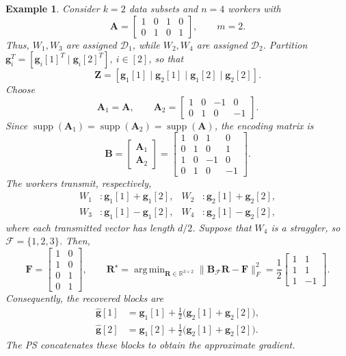 \documentclass[journal,draftcls,onecolumn]{IEEEtran}
\theoremstyle{mystyle}
\newtheorem{example}{Example}
\DeclareMathOperator*{\argmin}{arg\,min}
\begin{document}
\begin{example}
Consider $k=2$ data subsets and $n=4$ workers with
\[
\mathbf{A}=
\begin{bmatrix}
1&0&1&0\\
0&1&0&1
\end{bmatrix},
\qquad m=2.
\]
Thus, $W_1,W_3$ are assigned $\mathcal{D}_1$, while $W_2,W_4$ are
assigned $\mathcal{D}_2$. Partition
$\mathbf{g}_i^T=[\mathbf{g}_i[1]^T\mid\mathbf{g}_i[2]^T]$, $i\in[2]$,
so that
\[
\mathbf{Z}
=
[\mathbf{g}_1[1]\mid\mathbf{g}_2[1]\mid
 \mathbf{g}_1[2]\mid\mathbf{g}_2[2]].
\]
Choose
\[
\mathbf{A}_1=\mathbf{A},
\qquad
\mathbf{A}_2=
\begin{bmatrix}
1&0&-1&0\\
0&1&0&-1
\end{bmatrix}.
\]
Since $\operatorname{supp}(\mathbf{A}_1)
=\operatorname{supp}(\mathbf{A}_2)
=\operatorname{supp}(\mathbf{A})$, the encoding matrix is
\[
\mathbf{B}
=
\begin{bmatrix}
\mathbf{A}_1\\
\mathbf{A}_2
\end{bmatrix}
=
\begin{bmatrix}
1&0&1&0\\
0&1&0&1\\
1&0&-1&0\\
0&1&0&-1
\end{bmatrix}.
\]
The workers transmit, respectively,
\[
\begin{aligned}
W_1&:\mathbf{g}_1[1]+\mathbf{g}_1[2],&
W_2&:\mathbf{g}_2[1]+\mathbf{g}_2[2],\\
W_3&:\mathbf{g}_1[1]-\mathbf{g}_1[2],&
W_4&:\mathbf{g}_2[1]-\mathbf{g}_2[2],
\end{aligned}
\]
where each transmitted vector has length $d/2$. Suppose that $W_4$ is a straggler, so
$\mathcal{F}=\{1,2,3\}$. Then,
\[
\mathbf{F}=
\begin{bmatrix}
1&0\\
1&0\\
0&1\\
0&1
\end{bmatrix},
\qquad
\mathbf{R}^{\star}
=
\argmin_{\mathbf{R}\in\mathbb{R}^{3\times2}}
\|\mathbf{B}_{\mathcal{F}}\mathbf{R}-\mathbf{F}\|_F^2
=
\frac{1}{2}
\begin{bmatrix}
1&1\\
1&1\\
1&-1
\end{bmatrix}.
\]
Consequently, the recovered blocks are
\[
\begin{aligned}
\widehat{\mathbf{g}}[1]
&=\mathbf{g}_1[1]
+\frac{1}{2}\bigl(\mathbf{g}_2[1]+\mathbf{g}_2[2]\bigr),\\
\widehat{\mathbf{g}}[2]
&=\mathbf{g}_1[2]
+\frac{1}{2}\bigl(\mathbf{g}_2[1]+\mathbf{g}_2[2]\bigr).
\end{aligned}
\]
The PS concatenates these blocks to obtain the approximate gradient.
\end{example}
\end{document}

